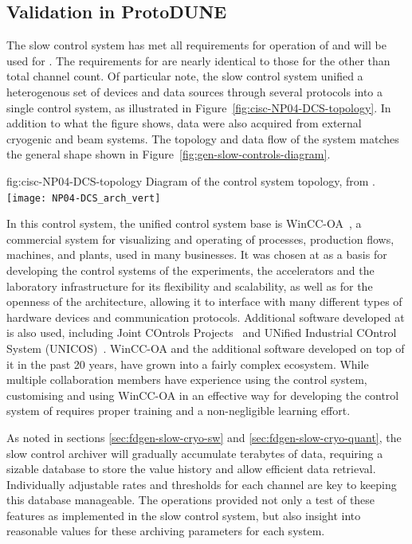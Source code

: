 \subsection{Validation in ProtoDUNE}
\label{sec:cisc-slow-control-pdsp}

The  slow control system has met
all requirements for operation of \cite{pdspdcs_proc} and will be used for .  The requirements for  are
nearly identical to those for the  other than
total channel count. Of particular note, the  slow control system unified a heterogenous set of devices and data sources
through several protocols into a
single control system, as illustrated in
Figure~\ref{fig:cisc-NP04-DCS-topology}. In addition to what
the figure shows, data were also acquired from external cryogenic and beam
systems.  The topology and data flow of the system matches the general
shape shown in Figure~\ref{fig:gen-slow-controls-diagram}.

\begin{dunefigure}{fig:cisc-NP04-DCS-topology}
{Diagram of the  control system topology, from \cite{pdspdcs_proc}.}
\texttt{[image: NP04-DCS\_arch\_vert]}
\end{dunefigure}

In this control system, the unified control system base is WinCC-OA~\cite{winccoa}, a commercial  system for visualizing and operating of processes, production flows, machines, and plants, used
in many businesses. It was chosen at  as a basis for
developing the control systems of the  experiments, the
accelerators and the laboratory infrastructure for its flexibility and
scalability, as well as for the openness of the architecture, allowing
it to interface with many different types of hardware devices and
communication protocols. Additional software developed at 
is also used, including Joint COntrols Projects~\cite{jcop} and UNified
Industrial COntrol System (UNICOS)~\cite{unicos}.  WinCC-OA and the
additional software developed on top of it in the past 20 years, have
grown into a fairly complex ecosystem. While multiple collaboration
members have experience using the  control system,
customising and using WinCC-OA in an effective way for developing the
control system of  requires proper training and a
non-negligible learning effort.


As noted in sections \ref{sec:fdgen-slow-cryo-sw} and \ref{sec:fdgen-slow-cryo-quant},
the slow control archiver will gradually accumulate terabytes of
data, requiring a sizable database to store the value history and
allow efficient data retrieval. Individually adjustable rates and
thresholds for each channel are key to keeping this database
manageable. The  operations provided not only a test of
these features as implemented in the  slow control system, but also insight into
reasonable values for these archiving parameters for each system.


